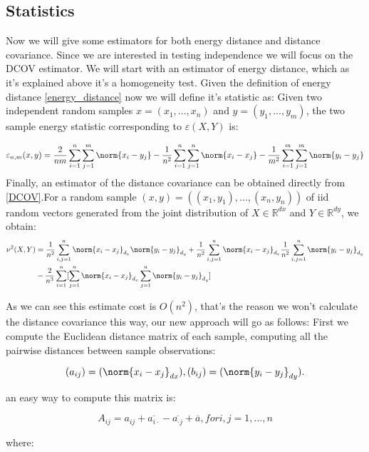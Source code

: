 \subsection{Statistics}
Now we will give some estimators for both energy distance and distance covariance. Since we are interested in testing independence we will focus on the DCOV estimator. We will start with an estimator of energy distance, which as it's explained above it's a homogeneity test.
Given the definition of energy distance \ref{energy_distance} now we will define it's statistic as: Given two independent random samples $x = (x_{1},...,x_{n})$ and  $y = (y_{1},...,y_{m})$, the two sample energy statistic corresponding to $\varepsilon(X,Y)$ is:

$$
\varepsilon_{n,m}(x,y) = \frac{2}{nm}\sum_{i=1}^{n}\sum_{j=1}^{m}\norm{x_{i}-y_{j}} - \frac{1}{n^{2}}\sum_{i=1}^{n}\sum_{j=1}^{n}\norm{x_{i}-x_{j}}- \frac{1}{m^{2}}\sum_{i=1}^{m}\sum_{j=1}^{m}\norm{y_{i}-y_{j}}
$$
Finally, an estimator of the distance covariance can be obtained directly from \ref{DCOV}.For a random sample $(x,y) = ((x_{1},y_{1}),...,(x_{n},y_{n}))$ of iid random vectors generated from the joint distribution of $X \in \mathbb{R}^{dx}$ and $Y \in \mathbb{R}^{dy}$, we obtain:
\begin{equation}{}
\begin{split}
\nu^{2}(X,Y)  
&= \frac{1}{n^{2}}\sum_{i,j=1}^{n}\norm{x_{i}-x_{j}}_{d_{x}}\norm{y_{i}-y_{j}}_{d_{y}} + \frac{1}{n^{2}}\sum_{i,j=1}^{n}\norm{x_{i}-x_{j}}_{d_{x}}\frac{1}{n^{2}}\sum_{i,j=1}^{n}\norm{y_{i}-y_{j}}_{d_{y}}\\
& -\frac{2}{n^{3}}\sum_{i=1}^{n}[\sum_{j=1}^{n}\norm{x_{i}-x_{j}}_{d_{x}}\sum_{j=1}^{n}\norm{y_{i}-y_{j}}_{d_{y}}]
\end{split}
\end{equation} 

As we can see this estimate cost is $O(n^{2})$, that's the reason we won't calculate the distance covariance this way, our new approach will go as follows:
First we compute the Euclidean distance matrix of each sample, computing all the pairwise distances between sample observations:

$$(a_{ij}) = (\norm{x_{i}-x_{j}}_{dx}), (b_{ij}) = (\norm{y_{i}-y_{j}}_{dy}).$$

an easy way to compute this matrix is:

$$A_{ij} = a_{ij} + \overline{a_{i \cdot}} - \overline{a_{\cdot j}} + \overline{a}, for i,j = 1,...,n$$

where:

